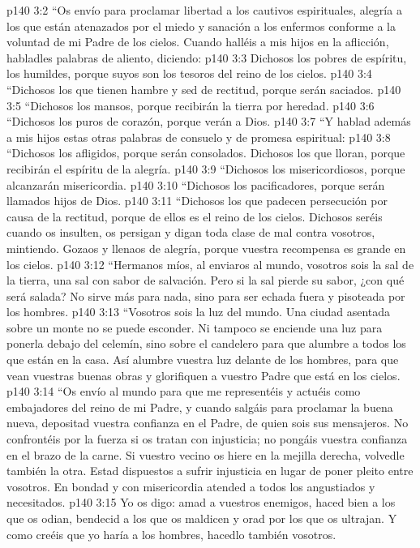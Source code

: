 \vs p140 3:2 “Os envío para proclamar libertad a los cautivos espirituales, alegría a los que están atenazados por el miedo y sanación a los enfermos conforme a la voluntad de mi Padre de los cielos. Cuando halléis a mis hijos en la aflicción, habladles palabras de aliento, diciendo:
\vs p140 3:3 Dichosos los pobres de espíritu, los humildes, porque suyos son los tesoros del reino de los cielos.
\vs p140 3:4 “Dichosos los que tienen hambre y sed de rectitud, porque serán saciados.
\vs p140 3:5 “Dichosos los mansos, porque recibirán la tierra por heredad.
\vs p140 3:6 “Dichosos los puros de corazón, porque verán a Dios.
\vs p140 3:7 “Y hablad además a mis hijos estas otras palabras de consuelo y de promesa espiritual:
\vs p140 3:8 “Dichosos los afligidos, porque serán consolados. Dichosos los que lloran, porque recibirán el espíritu de la alegría.
\vs p140 3:9 “Dichosos los misericordiosos, porque alcanzarán misericordia.
\vs p140 3:10 “Dichosos los pacificadores, porque serán llamados hijos de Dios.
\vs p140 3:11 “Dichosos los que padecen persecución por causa de la rectitud, porque de ellos es el reino de los cielos. Dichosos seréis cuando os insulten, os persigan y digan toda clase de mal contra vosotros, mintiendo. Gozaos y llenaos de alegría, porque vuestra recompensa es grande en los cielos.
\vs p140 3:12 “Hermanos míos, al enviaros al mundo, vosotros sois la sal de la tierra, una sal con sabor de salvación. Pero si la sal pierde su sabor, ¿con qué será salada? No sirve más para nada, sino para ser echada fuera y pisoteada por los hombres.
\vs p140 3:13 “Vosotros sois la luz del mundo. Una ciudad asentada sobre un monte no se puede esconder. Ni tampoco se enciende una luz para ponerla debajo del celemín, sino sobre el candelero para que alumbre a todos los que están en la casa. Así alumbre vuestra luz delante de los hombres, para que vean vuestras buenas obras y glorifiquen a vuestro Padre que está en los cielos.
\vs p140 3:14 “Os envío al mundo para que me representéis y actuéis como embajadores del reino de mi Padre, y cuando salgáis para proclamar la buena nueva, depositad vuestra confianza en el Padre, de quien sois sus mensajeros. No confrontéis por la fuerza si os tratan con injusticia; no pongáis vuestra confianza en el brazo de la carne. Si vuestro vecino os hiere en la mejilla derecha, volvedle también la otra. Estad dispuestos a sufrir injusticia en lugar de poner pleito entre vosotros. En bondad y con misericordia atended a todos los angustiados y necesitados.
\vs p140 3:15 Yo os digo: amad a vuestros enemigos, haced bien a los que os odian, bendecid a los que os maldicen y orad por los que os ultrajan. Y como creéis que yo haría a los hombres, hacedlo también vosotros.
